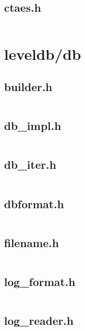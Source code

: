 \documentclass{article}
\begin{document}
\subsection{ctaes.h}
\inputminted{cpp}{/home/dufferzafar/dev/@clones/bitcoin/src/crypto/ctaes/ctaes.h}
\newpage

\section{leveldb/db}

\subsection{builder.h}
\inputminted{cpp}{/home/dufferzafar/dev/@clones/bitcoin/src/leveldb/db/builder.h}
\newpage

\subsection{db\_impl.h}
\inputminted{cpp}{/home/dufferzafar/dev/@clones/bitcoin/src/leveldb/db/db_impl.h}
\newpage

\subsection{db\_iter.h}
\inputminted{cpp}{/home/dufferzafar/dev/@clones/bitcoin/src/leveldb/db/db_iter.h}
\newpage

\subsection{dbformat.h}
\inputminted{cpp}{/home/dufferzafar/dev/@clones/bitcoin/src/leveldb/db/dbformat.h}
\newpage

\subsection{filename.h}
\inputminted{cpp}{/home/dufferzafar/dev/@clones/bitcoin/src/leveldb/db/filename.h}
\newpage

\subsection{log\_format.h}
\inputminted{cpp}{/home/dufferzafar/dev/@clones/bitcoin/src/leveldb/db/log_format.h}
\newpage

\subsection{log\_reader.h}
\inputminted{cpp}{/home/dufferzafar/dev/@clones/bitcoin/src/leveldb/db/log_reader.h}
\newpage
\end{document}
